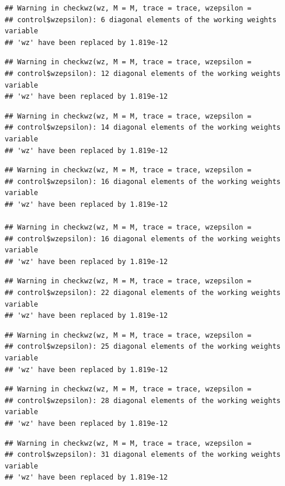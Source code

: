 \documentclass[]{article}
\begin{document}
\begin{verbatim}
## Warning in checkwz(wz, M = M, trace = trace, wzepsilon =
## control$wzepsilon): 6 diagonal elements of the working weights variable
## 'wz' have been replaced by 1.819e-12
\end{verbatim}

\begin{verbatim}
## Warning in checkwz(wz, M = M, trace = trace, wzepsilon =
## control$wzepsilon): 12 diagonal elements of the working weights variable
## 'wz' have been replaced by 1.819e-12
\end{verbatim}

\begin{verbatim}
## Warning in checkwz(wz, M = M, trace = trace, wzepsilon =
## control$wzepsilon): 14 diagonal elements of the working weights variable
## 'wz' have been replaced by 1.819e-12
\end{verbatim}

\begin{verbatim}
## Warning in checkwz(wz, M = M, trace = trace, wzepsilon =
## control$wzepsilon): 16 diagonal elements of the working weights variable
## 'wz' have been replaced by 1.819e-12

## Warning in checkwz(wz, M = M, trace = trace, wzepsilon =
## control$wzepsilon): 16 diagonal elements of the working weights variable
## 'wz' have been replaced by 1.819e-12
\end{verbatim}

\begin{verbatim}
## Warning in checkwz(wz, M = M, trace = trace, wzepsilon =
## control$wzepsilon): 22 diagonal elements of the working weights variable
## 'wz' have been replaced by 1.819e-12
\end{verbatim}

\begin{verbatim}
## Warning in checkwz(wz, M = M, trace = trace, wzepsilon =
## control$wzepsilon): 25 diagonal elements of the working weights variable
## 'wz' have been replaced by 1.819e-12
\end{verbatim}

\begin{verbatim}
## Warning in checkwz(wz, M = M, trace = trace, wzepsilon =
## control$wzepsilon): 28 diagonal elements of the working weights variable
## 'wz' have been replaced by 1.819e-12
\end{verbatim}

\begin{verbatim}
## Warning in checkwz(wz, M = M, trace = trace, wzepsilon =
## control$wzepsilon): 31 diagonal elements of the working weights variable
## 'wz' have been replaced by 1.819e-12
\end{verbatim}
\end{document}
